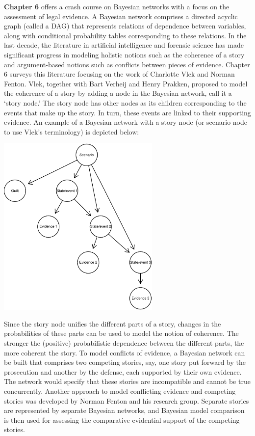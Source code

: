 \documentclass[
  10pt,
  dvipsnames,enabledeprecatedfontcommands]{scrartcl}
\begin{document}
\textbf{Chapter 6} offers a crash course on Bayesian networks with a
focus on the assessment of legal evidence. A Bayesian network comprises
a directed acyclic graph (called a DAG) that represents relations of
dependence between variables, along with conditional probability tables
corresponding to these relations. In the last decade, the literature in
artificial intelligence and forensic science has made significant
progress in modeling holistic notions such as the coherence of a story
and argument-based notions such as conflicts between pieces of evidence.
Chapter 6 surveys this literature focusing on the work of Charlotte Vlek
and Norman Fenton. Vlek, together with Bart Verheij and Henry Prakken,
proposed to model the coherence of a story by adding a node in the
Bayesian network, call it a `story node.' The story node has other nodes
as its children corresponding to the events that make up the story. In
turn, these events are linked to their supporting evidence. An example
of a Bayesian network with a story node (or scenario node to use Vlek's
terminology) is depicted below:

\begin{center}
\includegraphics[width=8cm]{vlek-scenario-node.pdf}
 \end{center}

Since the story node unifies the different parts of a story, changes in
the probabilities of these parts can be used to model the notion of
coherence. The stronger the (positive) probabilistic dependence between
the different parts, the more coherent the story. To model conflicts of
evidence, a Bayesian network can be built that comprises two competing
stories, say, one story put forward by the prosecution and another by
the defense, each supported by their own evidence. The network would
specify that these stories are incompatible and cannot be true
concurrently. Another approach to model conflicting evidence and
competing stories was developed by Norman Fenton and his research group.
Separate stories are represented by separate Bayesian networks, and
Bayesian model comparison is then used for assessing the comparative
evidential support of the competing stories.
\end{document}

